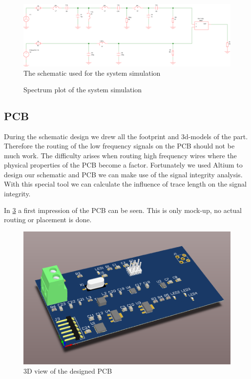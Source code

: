 \documentclass[a4paper, openany, oneside]{memoir}
\begin{document}
\begin{figure}[h]
    \centering
    \includegraphics[width=\textwidth]{fig_sim_system_schematic.pdf}
    \caption{The schematic used for the system simulation}
    \label{fig:schematic_system_simulation}
\end{figure}


\begin{figure}[H]
\centering
{}
\caption{Spectrum plot of the system simulation}
\label{fig:plot_system}
\end{figure}

\subsection{PCB}
During the schematic design we drew all the footprint and 3d-models of the part. Therefore the routing of the low frequency signals on the PCB should not be much work. The difficulty arises when routing high frequency wires where the physical properties of the PCB become a factor. Fortunately we used Altium to design our schematic and PCB we can make use of the signal integrity analysis. With this special tool we can calculate the influence of trace length on the signal integrity.

In \cref{fig:pcb_3d} a first impression of the PCB can be seen. This is only mock-up, no actual routing or placement is done.

\begin{figure}[h]
    \centering
    \includegraphics[width=\textwidth]{pcb.png}
    \caption{3D view of the designed PCB}
    \label{fig:pcb_3d}
\end{figure}
\end{document}
